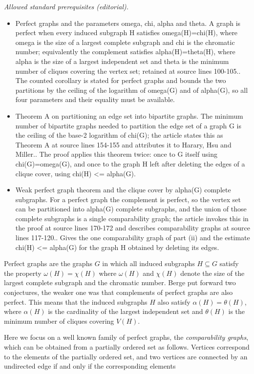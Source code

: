 \documentclass[12pt]{article}
\begin{document}
\noindent\textit{Allowed standard prerequisites (editorial).}\begin{itemize}
\item Perfect graphs and the parameters omega, chi, alpha and theta. A graph is perfect when every induced subgraph H satisfies omega(H)=chi(H), where omega is the size of a largest complete subgraph and chi is the chromatic number; equivalently the complement satisfies alpha(H)=theta(H), where alpha is the size of a largest independent set and theta is the minimum number of cliques covering the vertex set; retained at source lines 100-105.. The counted corollary is stated for perfect graphs and bounds the two partitions by the ceiling of the logarithm of omega(G) and of alpha(G), so all four parameters and their equality must be available.
\item Theorem A on partitioning an edge set into bipartite graphs. The minimum number of bipartite graphs needed to partition the edge set of a graph G is the ceiling of the base-2 logarithm of chi(G); the article states this as Theorem A at source lines 154-155 and attributes it to Harary, Hsu and Miller.. The proof applies this theorem twice: once to G itself using chi(G)=omega(G), and once to the graph H left after deleting the edges of a clique cover, using chi(H) <= alpha(G).
\item Weak perfect graph theorem and the clique cover by alpha(G) complete subgraphs. For a perfect graph the complement is perfect, so the vertex set can be partitioned into alpha(G) complete subgraphs, and the union of those complete subgraphs is a single comparability graph; the article invokes this in the proof at source lines 170-172 and describes comparability graphs at source lines 117-120.. Gives the one comparability graph of part (ii) and the estimate chi(H) <= alpha(G) for the graph H obtained by deleting its edges.
\end{itemize}\medskip
Perfect graphs are the graphs $G$ in which all induced subgraphs $H\subseteq G$
satisfy the property $\omega(H)=\chi(H)$ where $\omega(H)$ and $\chi(H)$ denote
the size of the largest complete subgraph and the chromatic number.
Berge put forward two conjectures, the weaker one was that complements of
perfect graphs are also perfect. This means that the induced subgraphs $H$ also satisfy $\alpha(H)=\theta(H)$,
where $\alpha(H)$ is the cardinality of the largest independent set and $\theta(H)$ is the minimum number of cliques covering $V(H)$.

Here we focus on a well known family of perfect graphs, the {\em comparability graphs},
which can be obtained from a partially ordered set as follows.
Vertices correspond to the elements of the partially ordered set,
and two vertices are connected by an undirected edge if and only if the corresponding elements
\end{document}
